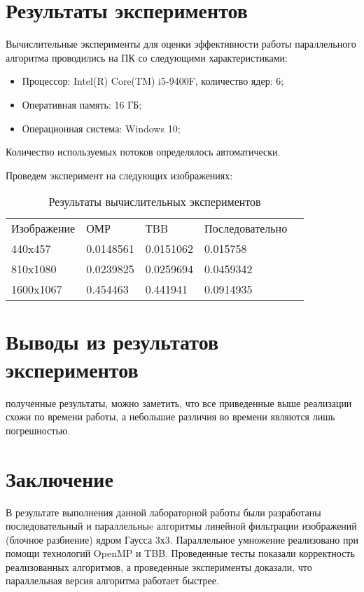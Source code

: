 \documentclass{report}
\begin{document}
\section*{Результаты экспериментов}
Вычислительные эксперименты для оценки эффективности работы параллельного алгоритма проводились на ПК со следующими характеристиками:
\begin{itemize}
\item Процессор: Intel(R) Core(TM) i5-9400F, количество ядер: 6;
\item Оперативная память: 16 ГБ;
\item Операционная система: Windows 10;
\end{itemize}
\par Количество используемых потоков определялось автоматически.
\par Проведем эксперимент на следующих изображениях:
\begin{table}[!h]
\caption{Результаты вычислительных экспериментов}
\centering
\begin{tabular}{p{3cm} p{3cm} p{3cm} p{3cm} p{3cm}}

Изображение    & ОМР        & ТBB         & Последовательно   \\
440x457        & 0.0148561  & 0.0151062  & 0.015758 \\
810x1080      & 0.0239825  & 0.0259694  & 0.0459342  \\
1600x1067      & 0.454463  & 0.441941  & 0.0914935
\end{tabular}
\end{table}

\newpage

\section*{Выводы из результатов экспериментов}
 полученные результаты, можно заметить, что все приведенные выше реализации схожи по времени работы, а небольшие различия во времени являются лишь погрешностью.
\newpage

\section*{Заключение}
В результате выполнения   данной лабораторной работы были разработаны последовательный и параллельныe алгоритмы линейной фильтрации изображений (блочное разбиение) ядром Гаусса 3х3. Параллельное умножение реализовано при помощи технологий OpenMP и TBB. Проведенные тесты показали корректность реализованных алгоритмов, а проведенные эксперименты доказали, что параллельная версия алгоритма работает быстрее.
\end{document}
